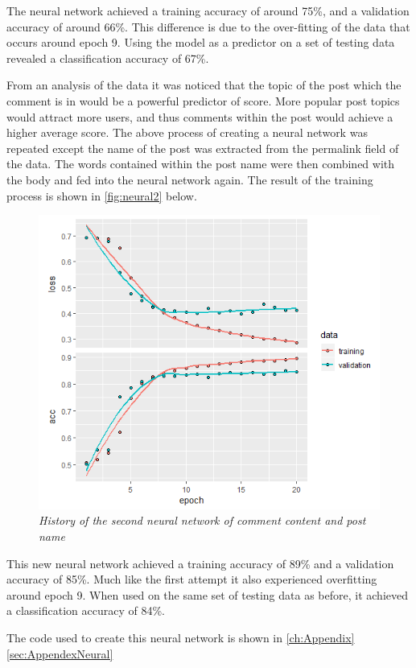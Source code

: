 The neural network achieved a training accuracy of around 75\%, and a validation accuracy of around 66\%. This difference is due to the over-fitting of the data that occurs around epoch 9. Using the model as a predictor on a set of testing data revealed a classification accuracy of 67\%.

From an analysis of the data it was noticed that the topic of the post which the comment is in would be a powerful predictor of score. More popular post topics would attract more users, and thus comments within the post would achieve a higher average score. The above process of creating a neural network was repeated except the name of the post was extracted from the permalink field of the data. The words contained within the post name were then combined with the body and fed into the neural network again. The result of the training process is shown in \autoref{fig:neural2} below.

 \begin{figure}[H]
        \centering
        \includegraphics[width=1.0\textwidth]{graphs/neural4.png}
        \caption{\textit{History of the second neural network of comment content and post name}}
        \label{fig:neural2}
    \end{figure}

This new neural network achieved a training accuracy of 89\% and a validation accuracy of 85\%. Much like the first attempt it also experienced overfitting around epoch 9. When used on the same set of testing data as before, it achieved a classification accuracy of 84\%.

The code used to create this neural network is shown in \autoref{ch:Appendix} \autoref{sec:AppendexNeural}


